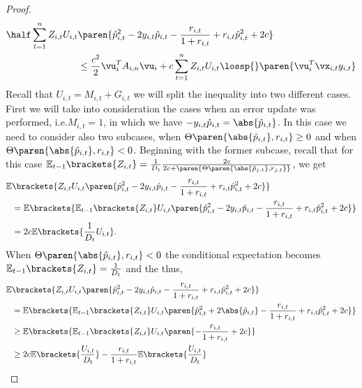 \begin{proof}
\begin{equation}
\begin{split}
\half \sum_{t=1}^{n}Z_{i,t}U_{i,t}&\paren{\hat{p}_{i,t}^2-2y_{i,t}\hat{p}_{i,t}-\frac{r_{i,t}}{1+r_{i,t}}+r_{i,t}\hat{p}_{i,t}^{2}+2c}\\
&\le\frac{c^2}{2} \vu_i^T A_{i,n} \vu_i+c\sum_{t=1}^{n}{Z_{i,t}U_{i,t}\lossp{}\paren{\vu_i^T\vx_{i,t}y_{i,t}}}
\label{sec_order_2}
\end{split}
\end{equation}
Recall that $U_{i,t}=M_{i,t}+G_{i,t}$ we will split the inequality into two different cases. First we will take into consideration the cases when an error update was performed, i.e.$M_{i,t}=1$, in which we have $-y_{i,t}\hat{p}_{i,t}=\abs{\hat{p}_{i,t}}$. In this case we need to consider also two subcases, when $\Theta\paren{\abs{\hat{p}_{i,t}},r_{i,t}}\ge0$   and when $\Theta\paren{\abs{\hat{p}_{i,t}},r_{i,t}}<0$. Beginning with the former subcase, recall that for this case 
$\mathbb{E}_{t-1}\brackets{Z_{i,t}}=\frac{1}{D_{t}}\frac{2c}{2c+\paren{\Theta\paren{\abs{\hat{p}_{j,t}},r_{j,t}}}}$, we get 
\begin{equation*}
\begin{split}
\mathbb{E}&\brackets{Z_{i,t}U_{i,t}\paren{\hat{p}_{i,t}^2-2y_{i,t}\hat{p}_{i,t}-\frac{r_{i,t}}{1+r_{i,t}}+r_{i,t}\hat{p}_{i,t}^{2}+2c}}\\
&=\mathbb{E}\brackets{\mathbb{E}_{t-1}\brackets{Z_{i,t}}U_{i,t}\paren{\hat{p}_{i,t}^2-2y_{i,t}\hat{p}_{i,t}-\frac{r_{i,t}}{1+r_{i,t}}+r_{i,t}\hat{p}_{i,t^{}}^{2}+2c}}\\
&=2c\mathbb{E}\brackets{\frac{1}{D_t}U_{i,t}}.
\end{split}
\end{equation*}
When $\Theta\paren{\abs{\hat{p}_{i,t}},r_{i,t}}<0$  the conditional expectation becomes $\mathbb{E}_{t-1}\brackets{Z_{i,t}}=\frac{1}{D_t}$ and the thus,
\begin{equation*}
\begin{split}
\mathbb{E}&\brackets{Z_{i,t}U_{i,t}\paren{\hat{p}_{i,t}^2-2y_{i,t}\hat{p}_{i,t}-\frac{r_{i,t}}{1+r_{i,t}}+r_{i,t}\hat{p}_{i,t}^{2}+2c}}\\
&=\mathbb{E}\brackets{\mathbb{E}_{t-1}\brackets{Z_{i,t}}U_{i,t}\paren{\hat{p}_{i,t}^2+2\abs{\hat{p}_{i,t}}-\frac{r_{i,t}}{1+r_{i,t}}+r_{i,t}\hat{p}_{i,t}^{2}+2c}}\\
&\ge\mathbb{E}\brackets{\mathbb{E}_{t-1}\brackets{Z_{i,t}}U_{i,t}\paren{-\frac{r_{i,t}}{1+r_{i,t}}+2c}}\\
&\ge 2c 
\mathbb{E}\brackets{\frac{U_{i,t}}{D_t}}-\frac{r_{i,t}}{1+r_{i,t}}\mathbb{E}\brackets{\frac{U_{i,t}}{D_t}}\\

\end{split}
\end{equation*}
\end{proof}
